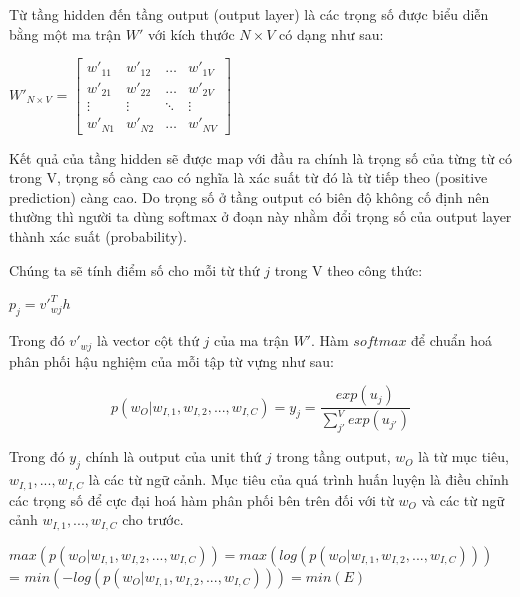 Từ tầng hidden đến tầng output (output layer) là các trọng số được biểu diễn bằng một ma trận $W'$ với kích thước $N\times V$ có dạng như sau:
\begin{center}
    $W'_{N\times V}$ =
    $\begin{bmatrix}
        w'_{11} & w'_{12} & \dots & w'_{1V}\\
        w'_{21} & w'_{22} & \dots & w'_{2V} \\
        \vdots & \vdots & \ddots & \vdots \\
        w'_{N1} & w'_{N2} & \dots & w'_{NV}
    \end{bmatrix}$
\end{center}

Kết quả của tầng hidden sẽ được map với đầu ra chính là trọng số của từng từ có trong V, trọng số càng cao có nghĩa là xác suất từ đó là từ tiếp theo (positive prediction) càng cao. Do trọng số ở tầng output có biên độ không cố định nên thường thì người ta dùng softmax ở đoạn này nhằm  đổi trọng số của output layer thành xác suất (probability).

Chúng ta sẽ tính điểm số cho mỗi từ thứ $j$ trong V theo công thức:
\begin{center}
    $p_{j} = v'^T_{wj}h$
\end{center}

Trong đó $v'_{wj}$ là vector cột thứ $j$ của ma trận $W'$. Hàm $softmax$ để chuẩn hoá phân phối hậu nghiệm của mỗi tập từ vựng như sau:
\begin{center}
    \begin{equation}
        p\left( w_{O} | w_{I,1},w_{I,2}, ..., w_{I,C} \right) = y_{j} = \frac{exp(u_{j})}{\sum_{j'}^{V}exp(u_{j'})}
    \end{equation}
\end{center}

Trong đó $y_{j}$ chính là output của unit thứ $j$ trong tầng output, $w_{O}$ là từ mục tiêu, $w_{I,1} , ..., w_{I, C}$ là các từ ngữ cảnh. Mục tiêu của quá trình huấn luyện là điều chỉnh các trọng số để cực đại hoá hàm phân phối bên trên đối với từ $w_{O}$ và các từ ngữ cảnh $w_{I, 1}, ..., w_{I, C}$ cho trước.
\begin{center}
    $max\left( p\left( w_{O} | w_{I,1},w_{I,2}, ..., w_{I,C} \right) \right) = max\left( log\left( p\left( w_{O} | w_{I,1},w_{I,2}, ..., w_{I,C} \right) \right) \right)$ \\ = $min\left( -log\left( p\left( w_{O} | w_{I,1},w_{I,2}, ..., w_{I,C} \right) \right) \right) = min(E) $
\end{center}

